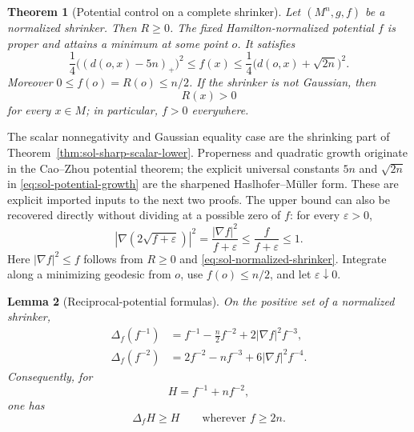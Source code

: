 \documentclass[10pt]{coll-l}
\newtheorem{theorem}{Theorem}[chapter]
\newtheorem{lemma}[theorem]{Lemma}
\theoremstyle{definition}
\theoremstyle{remark}
\numberwithin{section}{chapter}
\numberwithin{equation}{chapter}
\begin{document}
\begin{theorem}[Potential control on a complete shrinker]
\label{thm:sol-potential-control}
Let $(M^n,g,f)$ be a normalized shrinker.  Then $R\geq0$.  The fixed
Hamilton-normalized potential $f$ is proper and attains a minimum at some
point $o$.  It satisfies
\begin{equation}
 \frac14\bigl((d(o,x)-5n)_+\bigr)^2
   \leq f(x)
   \leq\frac14\bigl(d(o,x)+\sqrt{2n}\bigr)^2.             \label{eq:sol-potential-growth}
\end{equation}
Moreover $0\leq f(o)=R(o)\leq n/2$.  If the shrinker is not Gaussian, then
\begin{equation}
                         R(x)>0                           \label{eq:sol-positive-scalar}
\end{equation}
for every $x\in M$; in particular, $f>0$ everywhere.
\end{theorem}

The scalar nonnegativity and Gaussian equality case are the shrinking part
of Theorem~\ref{thm:sol-sharp-scalar-lower}.  Properness and quadratic
growth originate in the Cao--Zhou potential theorem; the explicit universal
constants $5n$ and $\sqrt{2n}$ in
\eqref{eq:sol-potential-growth} are the sharpened Haslhofer--M\"uller form.
These are explicit imported inputs to the next two
proofs.  The upper bound can also be recovered directly without dividing at
a possible zero of $f$: for every $\varepsilon>0$,
\[
 |\nabla(2\sqrt{f+\varepsilon})|^2
   =\frac{|\nabla f|^2}{f+\varepsilon}
   \leq\frac{f}{f+\varepsilon}\leq1.
\]
Here $|\nabla f|^2\leq f$ follows from $R\geq0$ and
\eqref{eq:sol-normalized-shrinker}.  Integrate along a minimizing geodesic
from $o$, use $f(o)\leq n/2$, and let $\varepsilon\downarrow0$.

\begin{lemma}[Reciprocal-potential formulas]
\label{lem:sol-reciprocal-formulas}
On the positive set of a normalized shrinker,
\begin{align}
 \Delta_f(f^{-1})
   &=f^{-1}-\frac n2f^{-2}+2|\nabla f|^2f^{-3},           \label{eq:sol-drift-f-inverse}\\
 \Delta_f(f^{-2})
   &=2f^{-2}-nf^{-3}+6|\nabla f|^2f^{-4}.               \label{eq:sol-drift-f-inverse-square}
\end{align}
Consequently, for
\begin{equation}
                  H=f^{-1}+nf^{-2},                      \label{eq:sol-reciprocal-H}
\end{equation}
one has
\begin{equation}
                  \Delta_fH\geq H
                  \qquad\text{wherever }f\geq2n.         \label{eq:sol-H-supersolution}
\end{equation}
\end{lemma}
\end{document}
